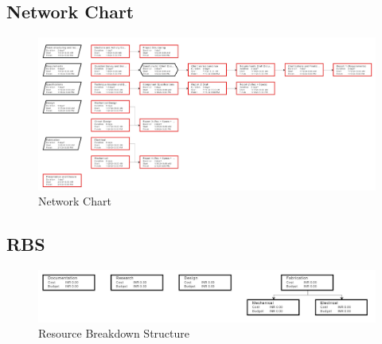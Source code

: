 \documentclass[12pt]{article}
\begin{document}
\subsection{Network Chart}
    \begin{figure}[H]
        \centering
        \includegraphics[width=1.05\linewidth]{NetworkChart_1}
        \caption{Network Chart}
        \label{fig:networkchart}
    \end{figure}

\subsection{RBS}
    \begin{figure}[H]
        \centering
        \includegraphics[width=1\linewidth]{RBS_1}
        \caption{Resource Breakdown Structure}
        \label{fig:rbs}
    \end{figure}
\end{document}
